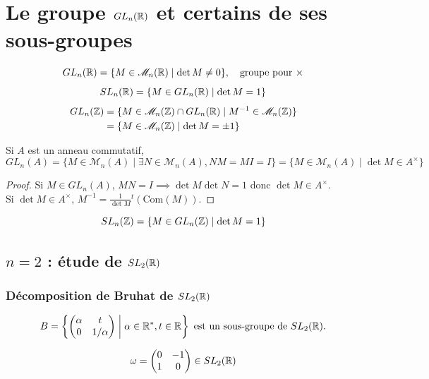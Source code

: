 \usetikzlibrary{decorations.pathmorphing}

\section*{Le groupe \texorpdfstring{$GL_n(\mathbb{R})$}{GLn(R)} et certains de ses sous-groupes}

\[ GL_n(\mathbb{R}) = \{ M \in \mathscr M_n(\mathbb{R}) \mid \det M \neq 0 \}, \quad \text{groupe pour } \times \]
\[ SL_n(\mathbb{R}) = \{ M \in GL_n(\mathbb{R}) \mid \det M = 1 \} \]
\begin{align*}
    GL_n(\mathbb{Z}) &= \{ M \in \mathscr M_n(\mathbb{Z}) \cap GL_n(\mathbb{R}) \mid M^{-1} \in \mathscr M_n(\mathbb{Z}) \} \\
    &= \{ M \in \mathscr M_n(\mathbb{Z}) \mid \det M = \pm 1 \}
\end{align*}

Si $A$ est un anneau commutatif, 
\[
    GL_n(A) = \{ M \in \mathscr M_n(A) \mid \exists N \in \mathscr M_n(A), NM=MI=I \} = \{ M \in \mathscr M_n(A) \mid \det M \in A^\times \}
\]

\begin{proof}
    Si $M \in GL_n(A)$, $MN=I \implies \det M \det N = 1$ donc $\det M \in A^\times$. \\
    Si $\det M \in A^\times$, $M^{-1} = \frac{1}{\det M} {}^t(\text{Com}(M))$.
\end{proof}

\[ SL_n(\mathbb{Z}) = \{ M \in GL_n(\mathbb{Z}) \mid \det M = 1 \} \]

\subsection*{\texorpdfstring{$n=2$}{n=2} : étude de \texorpdfstring{$SL_2(\mathbb{R})$}{SL2(R)}}

\subsubsection*{Décomposition de Bruhat de \texorpdfstring{$SL_2(\mathbb{R})$}{SL2(R)}}

\[ B = \left\{ \begin{pmatrix} \alpha & t \\ 0 & 1/\alpha \end{pmatrix} \;\middle|\; \alpha \in \mathbb{R}^*, t \in \mathbb{R} \right\} \text{ est un sous-groupe de } SL_2(\mathbb{R}). \]

\[ \omega = \begin{pmatrix} 0 & -1 \\ 1 & 0 \end{pmatrix} \in SL_2(\mathbb{R}) \]

